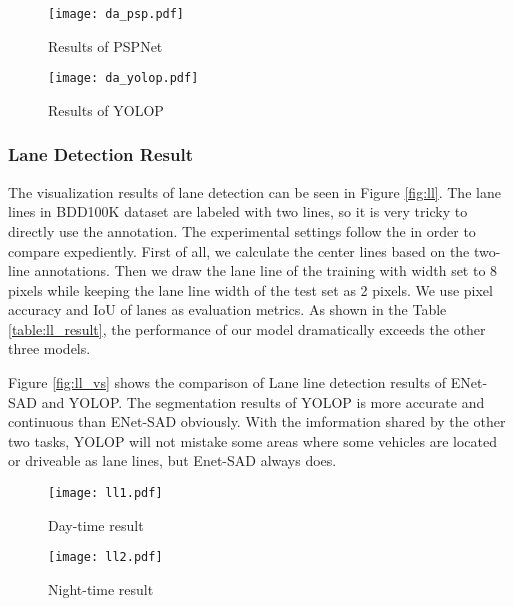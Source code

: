 \documentclass[10pt,twocolumn,letterpaper]{article}
\begin{document}
\begin{figure*}
\centering
\begin{subfigure}{\linewidth}
  \texttt{[image: da\_psp.pdf]}
  \caption{Results of PSPNet}
\end{subfigure}

\begin{subfigure}{\linewidth}
  \texttt{[image: da\_yolop.pdf]}
  \caption{Results of YOLOP}
\end{subfigure}
\caption{Comparison between the drivable area segmentation results of PSPNet and YOLOP. Top Row: Drivable area segmentation results of PSPNet. Bottom row: Drivable area segmentation results of YOLOP. The yellow ellipses are the false negative. The red  ellipses indicate the false positive.}
\label{fig:da_vs}
\end{figure*}



\subsubsection{Lane Detection Result}
The visualization results of lane detection can be seen in Figure \ref{fig:ll}. The lane lines in BDD100K dataset are labeled with two lines, so it is very tricky to directly use the annotation. The experimental settings follow the \cite{sad-enet} in order to compare expediently. First of all, we calculate the center lines based on the two-line annotations. Then we draw the lane line of the training with width set to 8 pixels while keeping the lane line width of the test set as 2 pixels. We use pixel accuracy and IoU of lanes as evaluation metrics. As shown in the Table \ref{table:ll_result}, the performance of our model dramatically exceeds the other three models.


Figure \ref{fig:ll_vs} shows the comparison of Lane line detection results of ENet-SAD and YOLOP. The segmentation results of YOLOP is more accurate and continuous than ENet-SAD obviously. With the imformation shared by the other two tasks, YOLOP will not mistake some areas where some vehicles are located or driveable as lane lines, but Enet-SAD always does.


\begin{figure*}
\centering
\begin{subfigure}{\linewidth}
  \texttt{[image: ll1.pdf]}
  \caption{Day-time result}
\end{subfigure}

\begin{subfigure}{\linewidth}
  \texttt{[image: ll2.pdf]}
  \caption{Night-time result}
\end{subfigure}
   \caption{Visualization of the lane detection results of YOLOP. Top Row: Lane detection results in day-time scenes. Bottom row: Lane detection results in night scenes.}
\label{fig:ll}
\end{figure*}
\end{document}
